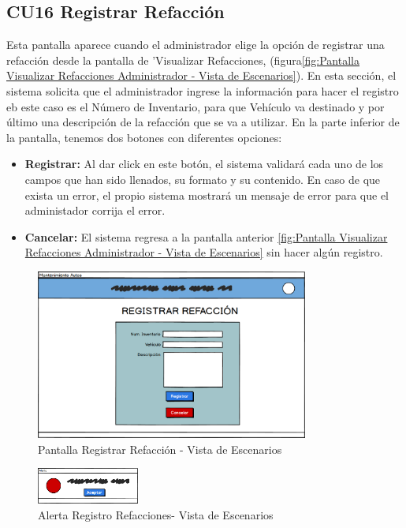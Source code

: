 \subsection{CU16 Registrar Refacción}
Esta pantalla aparece cuando el administrador elige la opción de registrar una refacción desde la pantalla de 'Visualizar Refacciones, (figura\ref{fig:Pantalla Visualizar Refacciones Administrador - Vista de Escenarios}). En esta sección, el sistema solicita que el administrador ingrese la información para hacer el registro eb este caso es el Número de Inventario, para que Vehículo va destinado y por último una descripción de la refacción que se va a utilizar. En la parte inferior de la pantalla, tenemos dos botones con diferentes opciones:
\begin{itemize}
	\item \textbf{Registrar:} Al dar click en este botón, el sistema validará cada uno de los campos que han sido llenados, su formato y su contenido. En caso de que exista un error, el propio sistema mostrará un mensaje de error para que el administador corrija el error.
	\item \textbf{Cancelar:} El sistema regresa a la pantalla anterior \ref{fig:Pantalla Visualizar Refacciones Administrador - Vista de Escenarios} sin hacer algún registro.
\end{itemize} 
\begin{figure}[!h]
	\centering
	\includegraphics[width=0.8\textwidth]{./diseno/vescenarios/imagenes/registrarRefacciones}
	\caption{Pantalla Registrar Refacción - Vista de Escenarios}
	\label{fig:Pantalla Registrar Refacción - Vista de Escenarios}
\end{figure}
\begin{figure}[!h]
	\centering
	\includegraphics[width=0.3\textwidth]{./diseno/vescenarios/imagenes/alerta}
	\caption{Alerta Registro Refacciones- Vista de Escenarios}
	\label{fig:Alerta Registro Refacciones - Vista de Escenarios}
\end{figure}